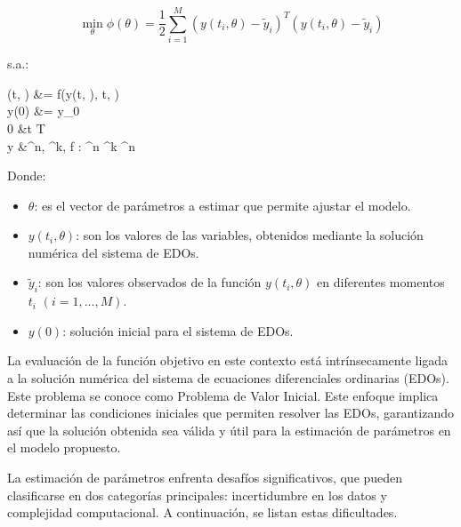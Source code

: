 \documentclass{article}
\begin{document}
    \begin{equation}
        \min_{\theta} \phi(\theta) = \frac{1}{2} \sum_{i=1}^{M} (y(t_i, \theta) - \tilde{y}_i)^T (y(t_i,    \theta) - \tilde{y}_i)
    \end{equation}
    
    s.a.: 
    
        
        \begin{center}
        
        (t, \theta) &= f(y(t, \theta), t, \theta) \\
        y(0) &= y_0 \\
        0 &\leq t \leq T \\
        y &\in {}^n, \quad \theta \in {}^k, \quad f : ^n \times {}^k \times [0, T] \rightarrow {}^n
        
        \end{center}
    
    Donde:
    \begin{itemize}
        \item $\theta$: es el vector de parámetros a estimar que permite ajustar el modelo.
        \item $y(t_i, \theta)$: son los valores de las variables, obtenidos mediante la solución numérica del sistema de EDOs.
        \item $\tilde{y}_i$: son los valores observados de la función $y(t_i, \theta)$ en diferentes momentos $t_i$ $(i = 1, ..., M)$.
        \item $y(0)$: solución inicial para el sistema de EDOs.
    \end{itemize}
  
    La evaluación de la función objetivo en este contexto está intrínsecamente ligada a la solución numérica del sistema de ecuaciones diferenciales ordinarias (EDOs). Este problema se conoce como Problema de Valor Inicial. Este enfoque implica determinar las condiciones iniciales que permiten resolver las EDOs, garantizando así que la solución obtenida sea válida y útil para la estimación de parámetros en el modelo propuesto.

        La estimación de parámetros enfrenta desafíos significativos, que pueden clasificarse en dos categorías principales: incertidumbre en los datos y complejidad computacional. A continuación, se listan estas dificultades. \\
\end{document}
